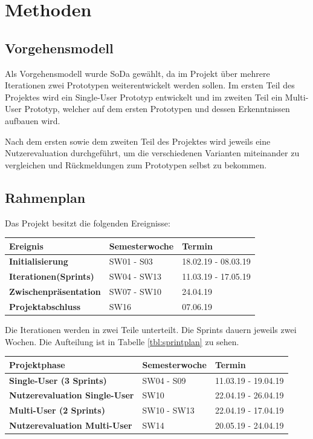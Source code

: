 \chapter{Methoden}
\label{ch:Methoden}

\section{Vorgehensmodell}
Als Vorgehensmodell wurde SoDa gewählt, da im Projekt über mehrere Iterationen zwei Prototypen weiterentwickelt werden sollen. Im ersten Teil des Projektes wird ein Single-User Prototyp entwickelt und im zweiten Teil ein Multi-User Prototyp, welcher auf dem ersten Prototypen und dessen Erkenntnissen aufbauen wird.

\noindent Nach dem ersten sowie dem zweiten Teil des Projektes wird jeweils eine Nutzerevaluation durchgeführt, um die verschiedenen Varianten miteinander zu vergleichen und Rückmeldungen zum Prototypen selbst zu bekommen.

\section{Rahmenplan}
Das Projekt besitzt die folgenden Ereignisse:
\begin{center}
	\begin{tabular}	{ |l|l|l| }
		\hline
		\rowcolor{black}
		\color{white} \textbf{Ereignis} & \color{white} \textbf{Semesterwoche} & 
		\color{white} \textbf{Termin} \\
		\hline
		\textbf{Initialisierung} & SW01 - S03 & 18.02.19 - 08.03.19 \\
		\hline
		\textbf{Iterationen(Sprints)} & SW04 - SW13 & 11.03.19 - 17.05.19 \\
		\hline
		\textbf{Zwischenpräsentation} & SW07 - SW10 & 24.04.19 \\
		\hline
		\textbf{Projektabschluss} & SW16 & 07.06.19 \\
		\hline		
	\end{tabular}
\end{center}
\label{tbl:rahmenplan}

\bigskip
Die Iterationen werden in zwei Teile unterteilt. Die Sprints dauern jeweils zwei Wochen. Die Aufteilung ist in Tabelle \ref{tbl:sprintplan} zu sehen.
\begin{center}
	\begin{tabular}	{ |l|l|l| }
		\hline
		\rowcolor{black}
		\color{white} \textbf{Projektphase} & \color{white} \textbf{Semesterwoche} & 
		\color{white} \textbf{Termin} \\
		\hline
		\textbf{Single-User (3 Sprints)} & SW04 - S09 & 11.03.19 - 19.04.19 \\
		\hline
		\textbf{Nutzerevaluation Single-User} & SW10 & 22.04.19 - 26.04.19 \\
		\hline
		\textbf{Multi-User (2 Sprints)} & SW10 - SW13 & 22.04.19 - 17.04.19\\
		\hline
		\textbf{Nutzerevaluation Multi-User} & SW14 & 20.05.19 - 24.04.19 \\
		\hline		
	\end{tabular}
\end{center}
\label{tbl:sprintplan}

